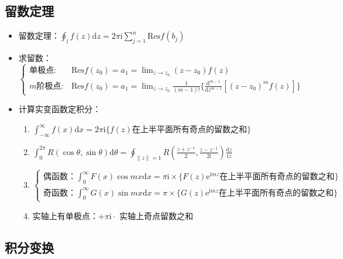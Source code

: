 \documentclass{article}
\begin{document}
\subsection{留数定理}

\begin{itemize}
    \item 留数定理：$\oint_lf(z)\mathrm{d}z=2\pi\mathrm{i}\sum^n_{j=1}\mathrm{Res}f(b_j)$
    \item 求留数：$\begin{cases}\text{单极点}:&\mathrm{Res}f(z_0)=a_1=\lim_{z\to z_0}(z-z_0)f(z)\\ m \text{阶极点}:&\mathrm{Res}f(z_0)=a_1=\lim_{z\to z_0}\frac{1}{(m-1)!}\{\frac{\mathrm{d}^{m-1}}{\mathrm{d}z^{m-1}}[(z-z_0)^mf(z)]\}\end{cases}$
    \item 计算实变函数定积分：\begin{enumerate}
        \item $\int^{\infty}_{-\infty}f(x)\mathrm{d}x=2\pi\mathrm{i}\{f(z) \text{在上半平面所有奇点的留数之和}\}$
        \item $\int^{2\pi}_0R(\cos\theta,\sin\theta)\mathrm{d}\theta=\oint_{\|z\|=1}R(\frac{z+z^{-1}}{2}, \frac{z-z^{-1}}{2\mathrm{i}})\frac{\mathrm{d}z}{\mathrm{i}z}$
        \item $\begin{cases}偶函数：\int^\infty_0F(x)\cos mx\mathrm{d}x=\pi\mathrm{i} \times \{F(z)\mathrm{e}^{\mathrm{i}mz}\text{在上半平面所有奇点的留数之和}\}\\ 奇函数：\int^\infty_0G(x)\sin mx\mathrm{d}x=\pi \times \{G(z)\mathrm{e}^{\mathrm{i}mz}\text{在上半平面所有奇点的留数之和}\}\end{cases}$
        \item 实轴上有单极点：$+\pi\mathrm{i}\cdot$ 实轴上奇点留数之和
    \end{enumerate}
\end{itemize}

\subsection{积分变换}
\end{document}
